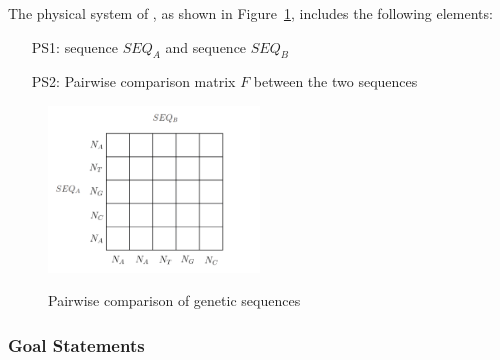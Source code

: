 \documentclass[12pt]{article}
\begin{document}

The physical system of \progname{}, as shown in Figure~\ref{fig:sequence_alignment},
includes the following elements:

\begin{itemize}

\item[PS1:] sequence $SEQ_A$ and sequence $SEQ_B$

\item[PS2:] Pairwise comparison matrix $F$ between the two sequences

\end{itemize}

\begin{figure}[h!]
  \begin{center}
  {
   \includegraphics[width=0.5\textwidth]{physical_system_sublimat.png}
  }
  \caption{Pairwise comparison of genetic sequences}
  \label{fig:sequence_alignment}
  \end{center}
\end{figure}

\subsubsection{Goal Statements}

\end{document}

